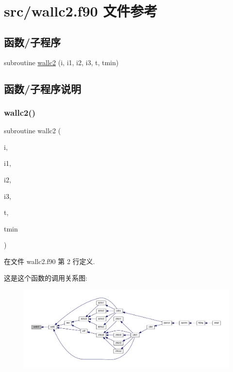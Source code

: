 \hypertarget{wallc2_8f90}{}\section{src/wallc2.f90 文件参考}
\label{wallc2_8f90}
\subsection*{函数/子程序}
\begin{DoxyCompactItemize}
\item 
subroutine \mbox{\hyperlink{wallc2_8f90_a1d60cc3c9e5052122887487872e273a1}{wallc2}} (i, i1, i2, i3, t, tmin)
\end{DoxyCompactItemize}


\subsection{函数/子程序说明}
\mbox{\label{wallc2_8f90_a1d60cc3c9e5052122887487872e273a1}} 
\subsubsection{\texorpdfstring{wallc2()}{wallc2()}}
{\footnotesize\ttfamily subroutine wallc2 (\begin{DoxyParamCaption}\item[{}]{i,  }\item[{}]{i1,  }\item[{}]{i2,  }\item[{}]{i3,  }\item[{}]{t,  }\item[{}]{tmin }\end{DoxyParamCaption})}



在文件 wallc2.\+f90 第 2 行定义.

这是这个函数的调用关系图\+:
\nopagebreak
\begin{figure}[H]
\begin{center}
\leavevmode
\includegraphics[width=350pt]{wallc2_8f90_a1d60cc3c9e5052122887487872e273a1_icgraph}
\end{center}
\end{figure}
